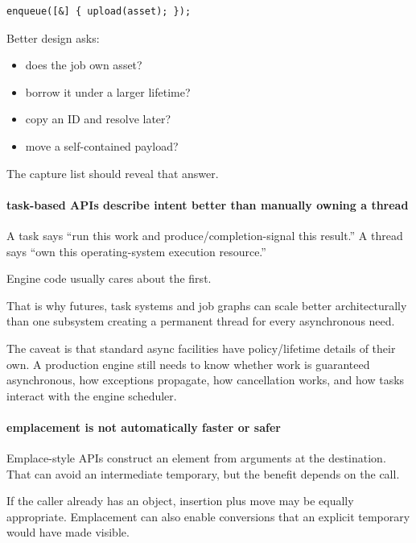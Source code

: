 \begin{verbatim}
enqueue([&] { upload(asset); });
\end{verbatim}

Better design asks:

\begin{itemize}
\tightlist
\item
  does the job own asset?
\item
  borrow it under a larger lifetime?
\item
  copy an ID and resolve later?
\item
  move a self-contained payload?
\end{itemize}

The capture list should reveal that answer.

\paragraph{task-based APIs describe intent better than manually owning a thread}\label{task-based-apis-describe-intent-better-than-manually-owning-a-thread}

A task says ``run this work and produce/completion-signal this result.'' A thread says ``own this operating-system execution resource.''

Engine code usually cares about the first.

That is why futures, task systems and job graphs can scale better architecturally than one subsystem creating a permanent thread for every asynchronous need.

The caveat is that standard async facilities have policy/lifetime details of their own. A production engine still needs to know whether work is guaranteed asynchronous, how exceptions propagate, how cancellation works, and how tasks interact with the engine scheduler.

\paragraph{emplacement is not automatically faster or safer}\label{emplacement-is-not-automatically-faster-or-safer}

Emplace-style APIs construct an element from arguments at the destination. That can avoid an intermediate temporary, but the benefit depends on the call.

If the caller already has an object, insertion plus move may be equally appropriate. Emplacement can also enable conversions that an explicit temporary would have made visible.

